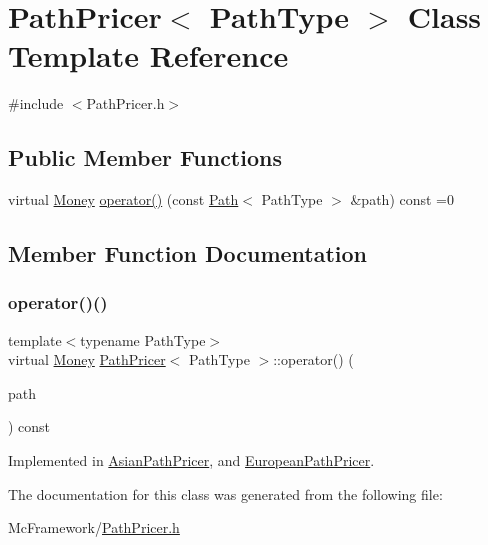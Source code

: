 \hypertarget{class_path_pricer}{}\section{Path\+Pricer$<$ Path\+Type $>$ Class Template Reference}
\label{class_path_pricer}


{\ttfamily \#include $<$Path\+Pricer.\+h$>$}

\subsection*{Public Member Functions}
\begin{DoxyCompactItemize}
\item 
virtual \hyperlink{_name_def_8h_a5a9d48c16a694e9a2d9f1eca730dc8c5}{Money} \hyperlink{class_path_pricer_a14b2a03f259bb56a24a66c9b95bdcf67}{operator()} (const \hyperlink{class_path}{Path}$<$ Path\+Type $>$ \&path) const =0
\end{DoxyCompactItemize}


\subsection{Member Function Documentation}
\hypertarget{class_path_pricer_a14b2a03f259bb56a24a66c9b95bdcf67}{}\label{class_path_pricer_a14b2a03f259bb56a24a66c9b95bdcf67} 
\subsubsection{\texorpdfstring{operator()()}{operator()()}}
{\footnotesize\ttfamily template$<$typename Path\+Type$>$ \\
virtual \hyperlink{_name_def_8h_a5a9d48c16a694e9a2d9f1eca730dc8c5}{Money} \hyperlink{class_path_pricer}{Path\+Pricer}$<$ Path\+Type $>$\+::operator() (\begin{DoxyParamCaption}\item[{const \hyperlink{class_path}{Path}$<$ Path\+Type $>$ \&}]{path }\end{DoxyParamCaption}) const\hspace{0.3cm}{\ttfamily [pure virtual]}}



Implemented in \hyperlink{class_asian_path_pricer_a929e8a33447f977bfc947e1d5344e353}{Asian\+Path\+Pricer}, and \hyperlink{class_european_path_pricer_a879d161eeff532f1f3e2fc5224b3361b}{European\+Path\+Pricer}.



The documentation for this class was generated from the following file\+:\begin{DoxyCompactItemize}
\item 
Mc\+Framework/\hyperlink{_path_pricer_8h}{Path\+Pricer.\+h}\end{DoxyCompactItemize}
